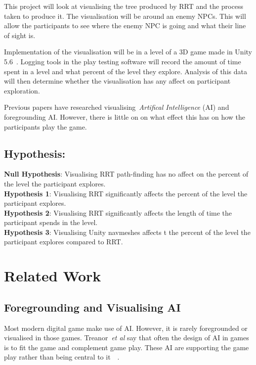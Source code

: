 \documentclass[journal]{IEEEtran}
\begin{document}
This project will look at visualising the tree produced by RRT and the process taken to produce it.  The visualisation will be around an enemy NPCs. This will allow the participants to see where the enemy NPC is going and what their line of sight is. 

Implementation  of the visualisation will be in a level of a 3D game made in Unity 5.6~\cite{software:Unity}. Logging tools in the play testing software will record the amount of time spent in a level and what percent of the level they explore.   Analysis of this data will then determine whether the visualisation has any affect on participant exploration.

Previous papers have researched visualising~\textit{Artifical Intelligence} (AI) and foregrounding AI. However, there is little on on what effect this has on how the participants play the game.


\subsection{Hypothesis:}
\textbf{Null Hypothesis}: Visualising RRT path-finding has no affect on the percent of the level the participant explores. \\
\textbf{Hypothesis 1}: Visualising RRT significantly affects the percent of the level the participant explores. \\
\textbf{Hypothesis 2}: Visualising RRT significantly affects the length of time the participant spends in the level. \\
\textbf{Hypothesis 3}:  Visualising Unity navmeshes affects t  the percent of the level the participant explores compared to RRT. \\

\section{Related Work}
\subsection{Foregrounding and Visualising AI}
Most modern digital game make use of AI.  However, it is rarely foregrounded or visualised in those games.   Treanor~\textit{et al} say that often the design of AI in games is to fit the game and complement game play. These AI are supporting the game play rather than being central to it~\cite{treanor2015}~\cite{eladhari2011}.  \\
\end{document}
